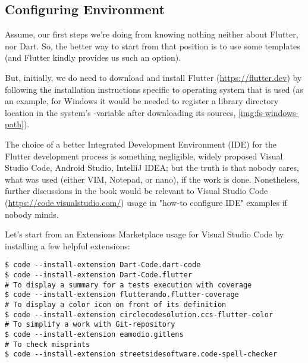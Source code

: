 
\subsection{Configuring Environment} \label{first-step}

Assume, our first steps we're doing from knowing nothing neither about Flutter, nor Dart. So, the better way to start 
from that position is to use some templates (and Flutter kindly provides us such an option).

But, initially, we do need to download and install Flutter (\href{https://flutter.dev}{https://flutter.dev}) by 
following the installation instructions specific to operating system that is used (as an example, for Windows it 
would be needed to register a library directory location in the system's -variable after downloading its 
sources, \cref{img:fs-windows-path}).


The choice of a better Integrated Development Environment (IDE) for the Flutter development process is something 
negligible, widely proposed Visual Studio Code, Android Studio, IntelliJ IDEA; but the truth is that nobody cares, 
what was used (either VIM, Notepad, or nano), if the work is done. Nonetheless, further discussions in the book would 
be relevant to Visual Studio Code (\href{https://code.visualstudio.com/}{https://code.visualstudio.com/}) usage in 
"how-to configure IDE" examples if nobody minds.

\noindent Let's start from an Extensions Marketplace usage for Visual Studio Code by installing a few helpful extensions:

\begin{lstlisting}[language=terminal]
$ code --install-extension Dart-Code.dart-code
$ code --install-extension Dart-Code.flutter
# To display a summary for a tests execution with coverage
$ code --install-extension flutterando.flutter-coverage
# To display a color icon on front of its definition
$ code --install-extension circlecodesolution.ccs-flutter-color
# To simplify a work with Git-repository
$ code --install-extension eamodio.gitlens
# To check misprints
$ code --install-extension streetsidesoftware.code-spell-checker
\end{lstlisting}

